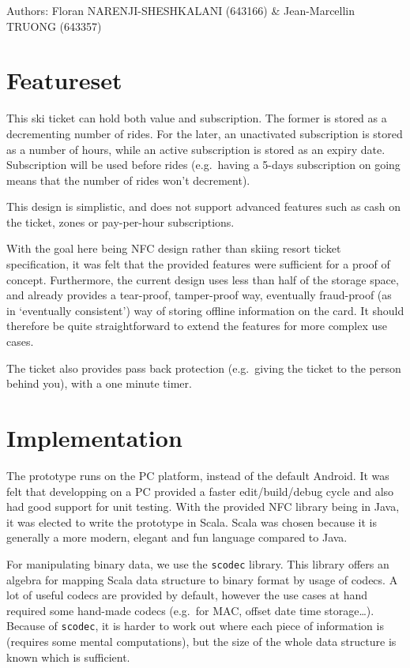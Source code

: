 \documentclass[paper=a4, fontsize=11pt]{scrartcl}
\author{Floran NARENJI-SHESHKALANI \& Jean-Marcellin TRUONG}
\begin{document}
Authors: Floran NARENJI-SHESHKALANI (643166) \& Jean-Marcellin TRUONG (643357)

\section{Featureset}

This ski ticket can hold both value and subscription.
The former is stored as a decrementing number of rides.
For the later, an unactivated subscription is stored as a number of hours,
while an active subscription is stored as an expiry date.
Subscription will be used before rides (e.g.\ having a 5-days subscription on
going means that the number of rides won't decrement).

This design is simplistic, and does not support advanced features such as cash
on the ticket, zones or pay-per-hour subscriptions.

With the goal here being NFC design rather than skiing resort ticket
specification, it was felt that the provided features were sufficient for a
proof of concept.
Furthermore, the current design uses less than half of the storage space, and
already provides a tear-proof, tamper-proof way, eventually fraud-proof (as in
`eventually consistent') way of storing offline information on the card.
It should therefore be quite straightforward to extend the features for more
complex use cases.

The ticket also provides pass back protection (e.g.\ giving the ticket to the
person behind you), with a one minute timer.

\section{Implementation}

The prototype runs on the PC platform, instead of the default Android.
It was felt that developping on a PC provided a faster edit/build/debug cycle
and also had good support for unit testing.
With the provided NFC library being in Java, it was elected to write the
prototype in Scala.
Scala was chosen because it is generally a more modern, elegant and fun language
compared to Java.

For manipulating binary data, we use the \texttt{scodec} library.
This library offers an algebra for mapping Scala data structure to binary format
by usage of codecs.
A lot of useful codecs are provided by default, however the use cases at hand
required some hand-made codecs (e.g.\ for MAC, offset date time storage\ldots).
Because of \texttt{scodec}, it is harder to work out where each piece of
information is (requires some mental computations), but the size of the whole
data structure is known which is sufficient.
\end{document}
